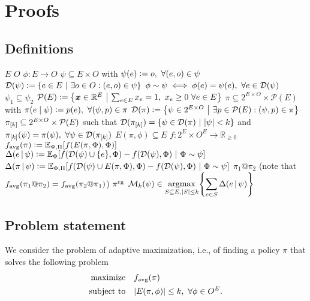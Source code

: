 \section{Proofs}


\subsection{Definitions}
\begin{description}[labelindent=0pt,leftmargin=7pt,itemindent=-2pt,itemsep=0pt]
   $E$
   $O$
   $\phi : E \to O$
   $\psi \subseteq E \times O$ with $\psi(e) \vcentcolon= o,\ \forall (e, o) \in \psi$
   $\dom(\psi) \defeq \sdef{e \in E}{\exists o \in O : (e, o) \in \psi}$
   $\phi \sim \psi \iff \phi(e) = \psi(e),\ \forall e \in \mathcal{D}(\psi)$
   $\psi_1 \subseteq \psi_2$
   $\mathcal{P}(E) \defeq \sdef{\*x \in \mathbb{R}^E}{\sum_{e \in E} x_e = 1,\ x_e \geq 0\ \forall e \in E}$
   $\pi \subseteq 2^{E \times O} \times \mathcal{P}(E)$ with $\pi(e\mid\psi) \vcentcolon= p(e),\ \forall (\psi, p) \in \pi$
   $\dom(\pi) \defeq \sdef{\psi \in 2^{E \times O}}{\exists p \in \mathcal{P}(E) : (\psi, p) \in \pi}$
   $\pi_{[k]} \subseteq 2^{E \times O} \times \mathcal{P}(E)$ such that $\dom(\pik) = \sdef{\psi \in \dom(\pi)}{|\psi| < k}$ and $\pik(\psi) = \pi(\psi),\ \forall \psi \in \dom(\pik)$
   $E(\pi, \phi) \subseteq E$
   $f : 2^E \times O^E \to \mathbb{R}_{\geq 0}$
   $\favg(\pi) \defeq \E[\Phi,\Pi]{f(E(\pi, \Phi), \Phi)}$
   $\D{e}{\psi} \defeq \E[\Phi]{f(\dom(\psi) \cup \{e\}, \Phi) - f(\dom(\psi), \Phi)}[\Phi \sim \psi]$
   $\D{\pi}{\psi} \defeq \E[\Phi,\Pi]{f(\dom(\psi) \cup E(\pi, \Phi), \Phi) - f(\dom(\psi), \Phi)}[\Phi \sim \psi]$
   $\pi_1 @ \pi_2$ (note that $f_{\mathrm{avg}}(\pi_1 @ \pi_2) = f_{\mathrm{avg}}(\pi_2 @ \pi_1)$)
   $\pi^{\textrm{rg}}$
   $\mathcal{M}_k(\psi) \in \displaystyle\argmax_{S \subseteq E, |S| \leq k}\left\{\sum_{e \in S} \D{e}{\psi} \right\}$
\end{description}

\subsection{Problem statement}
We consider the problem of adaptive maximization, i.e., of finding a policy $\pi$ that solves the following problem
\begin{align*}
  \textrm{maximize}&\quad  f_{\mathrm{avg}}(\pi)\\
  \textrm{subject to}&\quad  |E(\pi, \phi)| \leq k,\ \forall \phi \in O^E.
\end{align*}

